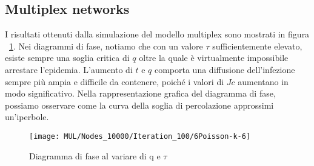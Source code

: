 \subsection{Multiplex networks}\label{subsec:res-multiplex-networks}
    I risultati ottenuti dalla simulazione del modello multiplex sono mostrati in figura ~\ref{fig:diagram_phase}.
    Nei diagrammi di fase, notiamo che con un valore $\tau$ sufficientemente elevato, esiste sempre una soglia critica
    di $q$ oltre la quale è virtualmente impossibile arrestare l'epidemia.
    L'aumento di $t$ e $q$ comporta una diffusione dell'infezione sempre più ampia e difficile da contenere,
    poiché i valori di $Jc$ aumentano in modo significativo.
    Nella rappresentazione grafica del diagramma di fase,
    possiamo osservare come la curva della soglia di percolazione approssimi un'iperbole.

    \begin{figure}[H]
        \texttt{[image: MUL/Nodes\_10000/Iteration\_100/6Poisson-k-6]}\caption{Diagramma di fase al variare di q e $\tau$}
        \label{fig:diagram_phase}
    \end{figure}
